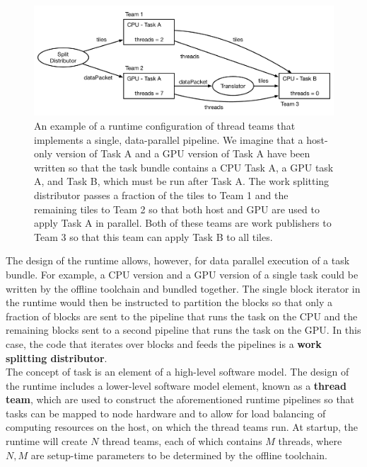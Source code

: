 \documentclass{article}
\begin{document}
\begin{figure}[!ht]
\begin{center}
\includegraphics[width=5.5in]{WorkSplittingExample.pdf}
\caption[]{An example of a runtime configuration of thread teams that implements
a single, data-parallel pipeline.  We imagine that a host-only version of Task A
and a GPU version of Task A have been written so that the task bundle contains a
CPU Task A, a GPU task A, and Task B, which must be run after Task A.  The work
splitting distributor passes a fraction of the tiles to Team 1 and the
remaining tiles to Team 2 so that both host and GPU are used to apply Task A in
parallel.  Both of these teams are work publishers to Team 3 so
that this team can apply Task B to all tiles.}
\label{fig:SplitItor}
\end{center}
\end{figure}

The design of the runtime allows, however, for data parallel execution of a task
bundle.  For example, a CPU version and a GPU version of a single task could
be written by the offline toolchain and bundled together.  The single block
iterator in the runtime would then be instructed to partition the blocks so that
only a fraction of blocks are sent to the pipeline that runs the task on the
CPU and the remaining blocks sent to a second pipeline that runs the task on the
GPU.  In this case, the code that iterates over blocks and feeds the pipelines
is a \textbf{work splitting distributor}.\\

The concept of task is an element of a high-level software model.  The design of
the runtime includes a lower-level software model element, known as a
\textbf{thread team}, which are used to construct the aforementioned runtime
pipelines so that tasks can be mapped to node hardware and to allow for load
balancing of computing resources on the host, on which the thread teams run.
At startup, the runtime will create $N$ thread teams, each of which contains $M$
threads, where $N, M$ are setup-time parameters to be determined by the offline
toolchain.\\
\end{document}
